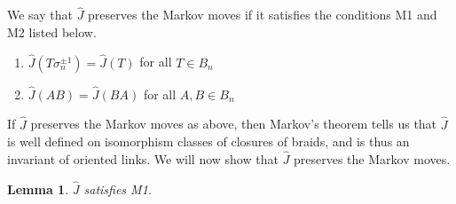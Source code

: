 \documentclass{amsart}
\theoremstyle{plain}
\newtheorem{lemma}[theorem]{Lemma}
\theoremstyle{definition}
\theoremstyle{definition}
\numberwithin{equation}{section}
\numberwithin{theorem}{section}
\numberwithin{equation}{section}
\let\hat=\widehat
\begin{document}
We say that $\hat{J}$ preserves the Markov moves if it satisfies the conditions M1 and M2 listed below.
\begin{enumerate}
  \item[M1] $\hat{J}(T\sigma_n^{\pm 1})=\hat{J}(T)$ for all $T\in B_n$
  \item[M2] $\hat{J}(AB)=\hat{J}(BA)$ for all $A,B \in B_n$
\end{enumerate}
If $\hat{J}$ preserves the Markov moves as above, then Markov's theorem tells us that $\hat{J}$ is well defined on isomorphism classes of closures of braids, and is thus an invariant of oriented links.
We will now show that $\hat{J}$ preserves the Markov moves.

\begin{lemma}\label{M1-pf}
  $\hat{J}$ satisfies M1.
\end{lemma}
\end{document}
